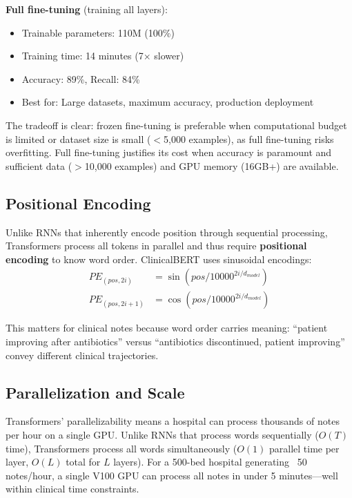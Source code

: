\documentclass[11pt,a4paper]{article}
\begin{document}
\textbf{Full fine-tuning} (training all layers):
\begin{itemize}
\item Trainable parameters: 110M (100\%)
\item Training time: 14 minutes (7$\times$ slower)
\item Accuracy: 89\%, Recall: 84\%
\item Best for: Large datasets, maximum accuracy, production deployment
\end{itemize}

The tradeoff is clear: frozen fine-tuning is preferable when computational budget is limited or dataset size is small ($<$5,000 examples), as full fine-tuning risks overfitting. Full fine-tuning justifies its cost when accuracy is paramount and sufficient data ($>$10,000 examples) and GPU memory (16GB+) are available.

\subsection{Positional Encoding}

Unlike RNNs that inherently encode position through sequential processing, Transformers process all tokens in parallel and thus require \textbf{positional encoding} to know word order. ClinicalBERT uses sinusoidal encodings:
\begin{align}
PE_{(pos, 2i)} &= \sin(pos / 10000^{2i/d_{model}}) \\
PE_{(pos, 2i+1)} &= \cos(pos / 10000^{2i/d_{model}})
\end{align}

This matters for clinical notes because word order carries meaning: ``patient improving after antibiotics'' versus ``antibiotics discontinued, patient improving'' convey different clinical trajectories.

\subsection{Parallelization and Scale}

Transformers' parallelizability means a hospital can process thousands of notes per hour on a single GPU. Unlike RNNs that process words sequentially ($O(T)$ time), Transformers process all words simultaneously ($O(1)$ parallel time per layer, $O(L)$ total for $L$ layers). For a 500-bed hospital generating ~50 notes/hour, a single V100 GPU can process all notes in under 5 minutes---well within clinical time constraints.
\end{document}
